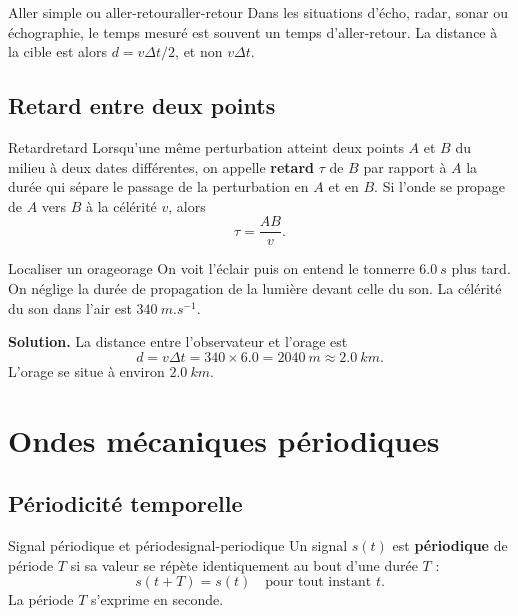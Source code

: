 \documentclass[11pt,a4paper]{article}
\begin{document}
\begin{warningbox}{Aller simple ou aller-retour}{aller-retour}
Dans les situations d'écho, radar, sonar ou échographie, le temps mesuré est souvent un temps d'aller-retour. La distance à la cible est alors $d=v\Delta t/2$, et non $v\Delta t$.
\end{warningbox}

\subsection{Retard entre deux points}

\begin{definitionbox}{Retard}{retard}
Lorsqu'une même perturbation atteint deux points $A$ et $B$ du milieu à deux dates différentes, on appelle \textbf{retard} $\tau$ de $B$ par rapport à $A$ la durée qui sépare le passage de la perturbation en $A$ et en $B$.
Si l'onde se propage de $A$ vers $B$ à la célérité $v$, alors
\[
\boxed{\tau=\frac{AB}{v}}.
\]
\end{definitionbox}

\begin{examplebox}{Localiser un orage}{orage}
On voit l'éclair puis on entend le tonnerre $\SI{6.0}{s}$ plus tard. On néglige la durée de propagation de la lumière devant celle du son. La célérité du son dans l'air est $\SI{340}{m.s^{-1}}$.

\textbf{Solution.} La distance entre l'observateur et l'orage est
\[
d=v\Delta t=340\times 6.0=\SI{2040}{m}\approx \SI{2.0}{km}.
\]
L'orage se situe à environ $\SI{2.0}{km}$.
\end{examplebox}

\section{Ondes mécaniques périodiques}

\subsection{Périodicité temporelle}

\begin{definitionbox}{Signal périodique et période}{signal-periodique}
Un signal $s(t)$ est \textbf{périodique} de période $T$ si sa valeur se répète identiquement au bout d'une durée $T$ :
\[
\boxed{s(t+T)=s(t)} \quad \text{pour tout instant }t.
\]
La période $T$ s'exprime en seconde.
\end{definitionbox}
\end{document}
